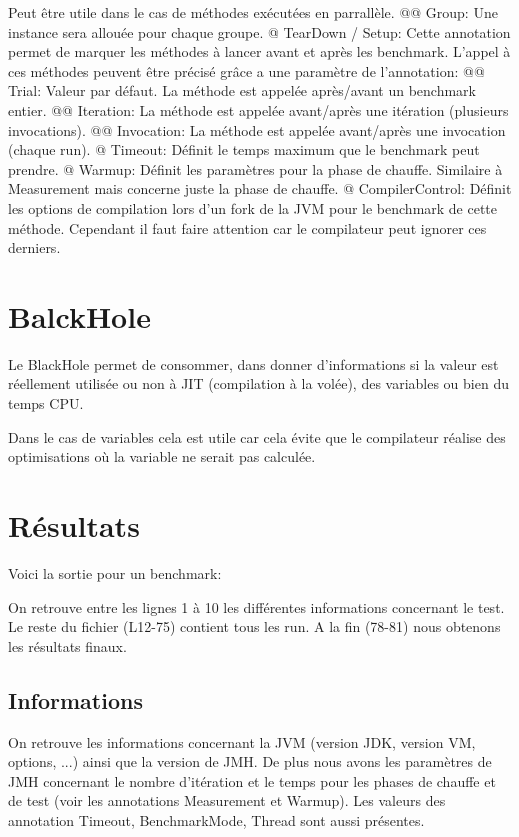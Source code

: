 \documentclass{report}
\begin{document}
\begin{easylist}[itemize]
				Peut être utile dans le cas de méthodes exécutées en parrallèle.
				@@ Group: Une instance sera allouée pour chaque groupe.
				@ TearDown / Setup: Cette annotation permet de marquer les méthodes à lancer avant et après les benchmark.
				L'appel à ces méthodes peuvent être précisé grâce a une paramètre de l'annotation:
				@@ Trial: Valeur par défaut. La méthode est appelée après/avant un benchmark entier.
				@@ Iteration: La méthode est appelée avant/après une itération (plusieurs invocations).
				@@ Invocation: La méthode est appelée avant/après une invocation (chaque run).
				@ Timeout: Définit le temps maximum que le benchmark peut prendre.
				@ Warmup: Définit les paramètres pour la phase de chauffe.
				Similaire à Measurement mais concerne juste la phase de chauffe.
				@ CompilerControl: Définit les options de compilation lors d'un fork de la JVM pour le benchmark de cette méthode.
				Cependant il faut faire attention car le compilateur peut ignorer ces derniers.
			\end{easylist}
		
		\section{BalckHole}
			Le BlackHole permet de consommer, dans donner d'informations si la valeur est réellement utilisée ou non à JIT (compilation à la volée), des variables ou bien du temps CPU.
			
			Dans le cas de variables cela est utile car cela évite que le compilateur réalise des optimisations où la variable ne serait pas calculée.
			
		\section{Résultats}
			Voici la sortie pour un benchmark:
			
			
			On retrouve entre les lignes 1 à 10 les différentes informations concernant le test.
			Le reste du fichier (L12-75) contient tous les run.
			A la fin (78-81) nous obtenons les résultats finaux.
			
			\subsection{Informations}
				On retrouve les informations concernant la JVM (version JDK, version VM, options, ...) ainsi que la version de JMH.
				De plus nous avons les paramètres de JMH concernant le nombre d'itération et le temps pour les phases de chauffe et de test (voir les annotations Measurement et Warmup).
				Les valeurs des annotation Timeout, BenchmarkMode, Thread sont aussi présentes.
			
\end{document}

